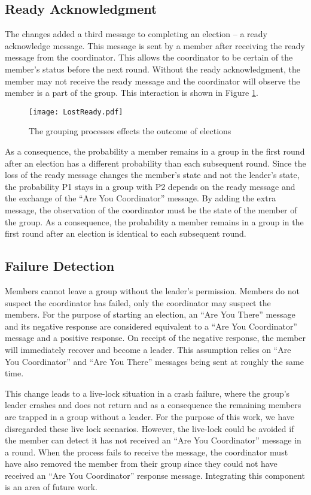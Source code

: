 \subsection{Ready Acknowledgment}

The changes added a third message to completing an election -- a ready acknowledge message.
This message is sent by a member after receiving the ready message from the coordinator.
This allows the coordinator to be certain of the member's status before the next round.
Without the ready acknowledgment, the member may not receive the ready message and the coordinator will observe the member is a part of the group.
This interaction is shown in Figure \ref{fig:lostready}.

\begin{figure}
\texttt{[image: LostReady.pdf]}
\caption{The grouping processes effects the outcome of elections} \label{fig:lostready}
\end{figure}

As a consequence, the probability a member remains in a group in the first round after an election has a different probability than each subsequent round.
Since the loss of the ready message changes the member's state and not the leader's state, the probability P1 stays in a group with P2 depends on the ready message and the exchange of the ``Are You Coordinator'' message.
By adding the extra message, the observation of the coordinator must be the state of the member of the group.
As a consequence, the probability a member remains in a group in the first round after an election is identical to each subsequent round.

\subsection{Failure Detection}

Members cannot leave a group without the leader's permission.
Members do not suspect the coordinator has failed, only the coordinator may suspect the members.
For the purpose of starting an election, an ``Are You There'' message and its negative response are considered equivalent to a ``Are You Coordinator'' message and a positive response.
On receipt of the negative response, the member will immediately recover and become a leader.
This assumption relies on ``Are You Coordinator'' and ``Are You There'' messages being sent at roughly the same time.

This change leads to a live-lock situation in a crash failure, where the group's leader crashes and does not return and as a consequence the remaining members are trapped in a group without a leader.
For the purpose of this work, we have disregarded these live lock scenarios.
However, the live-lock could be avoided if the member can detect it has not received an ``Are You Coordinator'' message in a round.
When the process fails to receive the message, the coordinator must have also removed the member from their group since they could not have received an ``Are You Coordinator'' response message.
Integrating this component is an area of future work.

